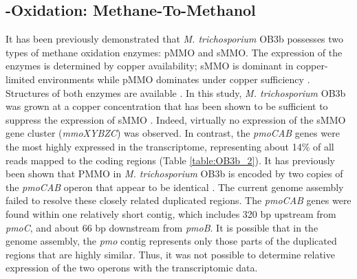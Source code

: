 \subsection{-Oxidation: Methane-To-Methanol}
It has been previously demonstrated that \textit{M. trichosporium} OB3b possesses two types of methane oxidation enzymes: pMMO and sMMO.
The expression of the enzymes is determined by copper availability; sMMO is dominant in copper-limited environments while pMMO dominates under copper sufficiency \cite{hakemian2007, semrau2010}.
Structures of both enzymes are available \cite{elango1997, hakemian2008}.
In this study, \textit{M. trichosporium} OB3b was grown at a copper concentration that has been shown to be sufficient to suppress the expression of sMMO \cite{park1991, phelps1992, nielsen1997, lloyd1999, murrell2000}.
Indeed, virtually no expression of the sMMO gene cluster (\textit{mmoXYBZC}) was observed.
In contrast, the \textit{pmoCAB} genes were the most highly expressed in the transcriptome, representing about 14\% of all reads mapped to the coding regions (Table \ref{table:OB3b_2}).
It has previously been shown that PMMO in \textit{M. trichosporium} OB3b is encoded by two copies of the \textit{pmoCAB} operon that appear to be identical \cite{gilbert2000}.
The current genome assembly failed to resolve these closely related duplicated regions.
The \textit{pmoCAB} genes were found within one relatively short contig, which includes 320 bp upstream from \textit{pmoC}, and about 66 bp downstream from \textit{pmoB}.
It is possible that in the genome assembly, the \textit{pmo} contig represents only those parts of the duplicated regions that are highly similar.
Thus, it was not possible to determine relative expression of the two operons with the transcriptomic data.

